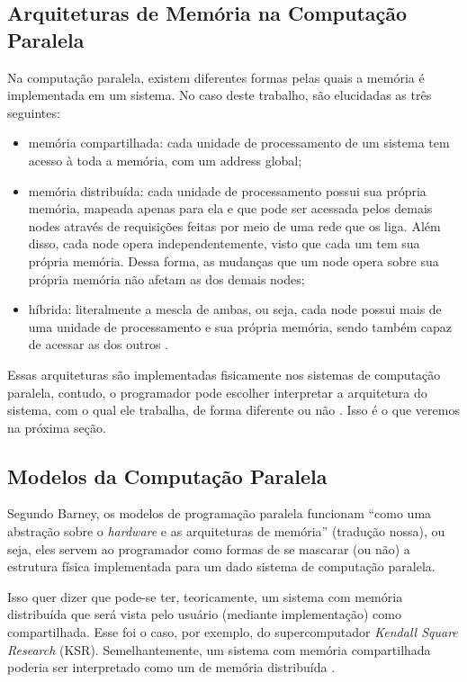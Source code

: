 \subsection{Arquiteturas de Memória na Computação Paralela}

\label{subsec:memory-architectures}

Na computação paralela, existem diferentes formas pelas quais a
memória é implementada em um sistema. No caso deste trabalho, são
elucidadas as três seguintes:
\begin{itemize}
	\item memória compartilhada: cada unidade de processamento de
	      um sistema tem acesso à toda a memória, com um \gls{address} global;
	\item memória distribuída: cada unidade de processamento possui
	      sua própria memória, mapeada apenas para ela e que pode ser
	      acessada pelos demais \glspl{node} através de requisições feitas por meio
	      de uma rede que os liga. Além disso, cada \gls{node} opera
	      independentemente, visto que cada um tem sua própria memória.
	      Dessa forma, as mudanças que um \gls{node} opera sobre sua própria
	      memória não afetam as dos demais \glspl{node};
	\item híbrida: literalmente a mescla de ambas, ou seja, cada
	      \gls{node} possui mais de uma unidade de processamento e sua
	      própria memória, sendo também capaz de acessar as dos outros
	      \cite{LLNL:parcomp}.
\end{itemize}

Essas arquiteturas são implementadas fisicamente nos sistemas de
computação paralela, contudo, o programador pode escolher interpretar
a arquitetura do sistema, com o qual ele trabalha, de forma diferente
ou não \cite{LLNL:parcomp}. Isso é o que veremos na próxima seção.

\subsection{Modelos da Computação Paralela}

\label{subsec:par-comp-models}

Segundo Barney, os modelos de programação paralela funcionam ``como
uma abstração sobre o \textit{hardware} e as arquiteturas de memória''
(tradução nossa), ou seja, eles servem ao programador como formas de
se mascarar (ou não) a estrutura física implementada para um dado
sistema de computação paralela.

Isso quer dizer que pode-se ter, teoricamente, um sistema com memória
distribuída que será vista pelo usuário (mediante implementação) como
compartilhada. Esse foi o caso, por exemplo, do supercomputador
\textit{Kendall Square Research} (KSR). Semelhantemente, um sistema
com memória compartilhada poderia ser interpretado como um de memória
distribuída \cite{LLNL:parcomp}.

